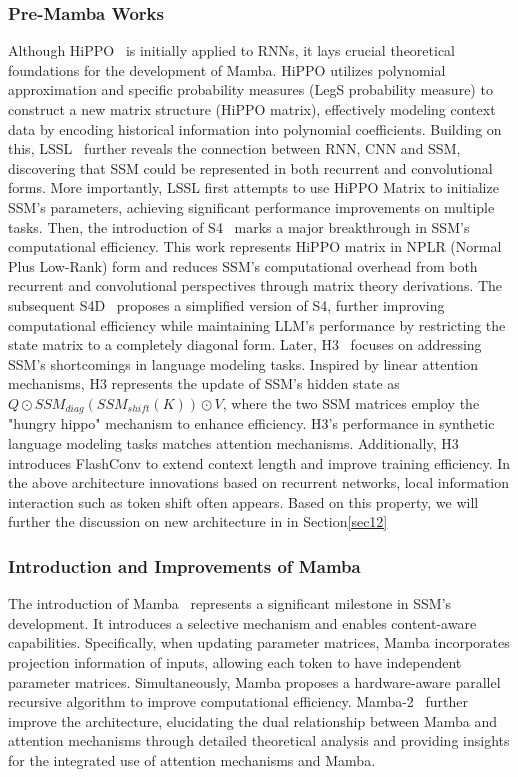 \subsubsection{Pre-Mamba Works}
Although HiPPO~\citep{gu2020hippo} is initially applied to RNNs, it lays crucial theoretical foundations for the development of Mamba. HiPPO utilizes polynomial approximation and specific probability measures (LegS probability measure) to construct a new matrix structure (HiPPO matrix), effectively modeling context data by encoding historical information into polynomial coefficients. Building on this, LSSL~\citep{gu2021combining} further reveals the connection between RNN, CNN and SSM, discovering that SSM could be represented in both recurrent and convolutional forms. More importantly, LSSL first attempts to use HiPPO Matrix to initialize SSM's parameters, achieving significant performance improvements on multiple tasks. Then, the introduction of S4~\citep{gu2021efficiently} marks a major breakthrough in SSM's computational efficiency. This work represents HiPPO matrix in NPLR (Normal Plus Low-Rank) form and reduces SSM's computational overhead from both recurrent and convolutional perspectives through matrix theory derivations. The subsequent S4D~\citep{gu2022parameterization} proposes a simplified version of S4, further improving computational efficiency while maintaining LLM's performance by restricting the state matrix to a completely diagonal form. Later, H3~\citep{fu2022hungry} focuses on addressing SSM's shortcomings in language modeling tasks. Inspired by linear attention mechanisms, H3 represents the update of SSM's hidden state as $Q\odot SSM_{diag}(SSM_{shift}(K))\odot V$, where the two SSM matrices employ the "hungry hippo" mechanism to enhance efficiency. H3's performance in synthetic language modeling tasks matches attention mechanisms. Additionally, H3 introduces FlashConv to extend context length and improve training efficiency. In the above architecture innovations based on recurrent networks, local information interaction such as token shift often appears. Based on this property, we will further the discussion on new architecture in \textbf{} in Section\ref{sec12}

\subsubsection{Introduction and Improvements of Mamba}
The introduction of Mamba~\citep{gu2023mamba} represents a significant milestone in SSM's development. It introduces a selective mechanism and enables content-aware capabilities. Specifically, when updating parameter matrices, Mamba incorporates projection information of inputs, allowing each token to have independent parameter matrices. Simultaneously, Mamba proposes a hardware-aware parallel recursive algorithm to improve computational efficiency. Mamba-2~\citep{daotransformers} further improve the architecture, elucidating the dual relationship between Mamba and attention mechanisms through detailed theoretical analysis and providing insights for the integrated use of attention mechanisms and Mamba.


